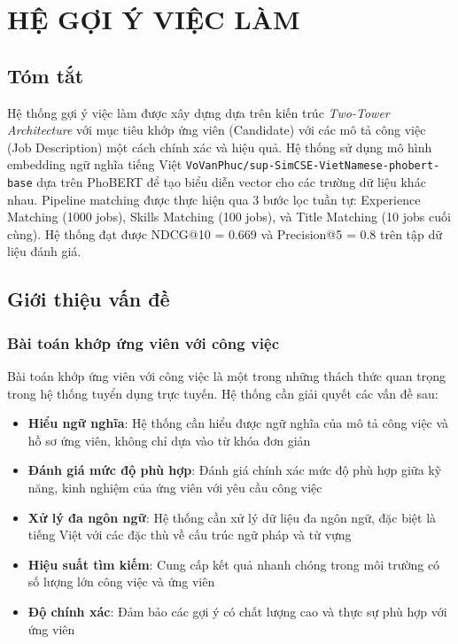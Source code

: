 \chapter{HỆ GỢI Ý VIỆC LÀM}
\label{chapter:job-recommendation}

\section{Tóm tắt}

Hệ thống gợi ý việc làm được xây dựng dựa trên kiến trúc \textit{Two-Tower Architecture} với mục tiêu khớp ứng viên (Candidate) với các mô tả công việc (Job Description) một cách chính xác và hiệu quả. Hệ thống sử dụng mô hình embedding ngữ nghĩa tiếng Việt \texttt{VoVanPhuc/sup-SimCSE-VietNamese-phobert-base} dựa trên PhoBERT để tạo biểu diễn vector cho các trường dữ liệu khác nhau. Pipeline matching được thực hiện qua 3 bước lọc tuần tự: Experience Matching (1000 jobs), Skills Matching (100 jobs), và Title Matching (10 jobs cuối cùng). Hệ thống đạt được NDCG@10 = 0.669 và Precision@5 = 0.8 trên tập dữ liệu đánh giá.

\section{Giới thiệu vấn đề}

\subsection{Bài toán khớp ứng viên với công việc}

Bài toán khớp ứng viên với công việc là một trong những thách thức quan trọng trong hệ thống tuyển dụng trực tuyến. Hệ thống cần giải quyết các vấn đề sau:

\begin{itemize}
    \item \textbf{Hiểu ngữ nghĩa}: Hệ thống cần hiểu được ngữ nghĩa của mô tả công việc và hồ sơ ứng viên, không chỉ dựa vào từ khóa đơn giản
    \item \textbf{Đánh giá mức độ phù hợp}: Đánh giá chính xác mức độ phù hợp giữa kỹ năng, kinh nghiệm của ứng viên với yêu cầu công việc
    \item \textbf{Xử lý đa ngôn ngữ}: Hệ thống cần xử lý dữ liệu đa ngôn ngữ, đặc biệt là tiếng Việt với các đặc thù về cấu trúc ngữ pháp và từ vựng
    \item \textbf{Hiệu suất tìm kiếm}: Cung cấp kết quả nhanh chóng trong môi trường có số lượng lớn công việc và ứng viên
    \item \textbf{Độ chính xác}: Đảm bảo các gợi ý có chất lượng cao và thực sự phù hợp với ứng viên
\end{itemize}

